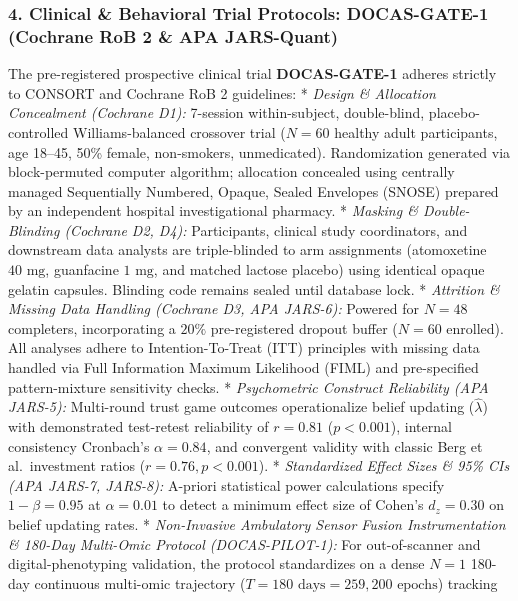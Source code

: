 \documentclass[
]{article}
\begin{document}
\subsubsection{4. Clinical \& Behavioral Trial Protocols: DOCAS-GATE-1
(Cochrane RoB 2 \& APA
JARS-Quant)}\label{clinical-behavioral-trial-protocols-docas-gate-1-cochrane-rob-2-apa-jars-quant}

The pre-registered prospective clinical trial \textbf{DOCAS-GATE-1}
adheres strictly to CONSORT and Cochrane RoB 2 guidelines: *
\emph{Design \& Allocation Concealment (Cochrane D1):} 7-session
within-subject, double-blind, placebo-controlled Williams-balanced
crossover trial (\(N = 60\) healthy adult participants, age 18--45, 50\%
female, non-smokers, unmedicated). Randomization generated via
block-permuted computer algorithm; allocation concealed using centrally
managed Sequentially Numbered, Opaque, Sealed Envelopes (SNOSE) prepared
by an independent hospital investigational pharmacy. * \emph{Masking \&
Double-Blinding (Cochrane D2, D4):} Participants, clinical study
coordinators, and downstream data analysts are triple-blinded to arm
assignments (atomoxetine \(40\text{ mg}\), guanfacine \(1\text{ mg}\),
and matched lactose placebo) using identical opaque gelatin capsules.
Blinding code remains sealed until database lock. * \emph{Attrition \&
Missing Data Handling (Cochrane D3, APA JARS-6):} Powered for \(N = 48\)
completers, incorporating a \(20\%\) pre-registered dropout buffer
(\(N = 60\) enrolled). All analyses adhere to Intention-To-Treat (ITT)
principles with missing data handled via Full Information Maximum
Likelihood (FIML) and pre-specified pattern-mixture sensitivity checks.
* \emph{Psychometric Construct Reliability (APA JARS-5):} Multi-round
trust game outcomes operationalize belief updating (\(\hat{\lambda}\))
with demonstrated test-retest reliability of \(r = 0.81\)
(\(p < 0.001\)), internal consistency Cronbach's \(\alpha = 0.84\), and
convergent validity with classic Berg et al.~investment ratios
(\(r = 0.76, p < 0.001\)). * \emph{Standardized Effect Sizes \& 95\% CIs
(APA JARS-7, JARS-8):} A-priori statistical power calculations specify
\(1 - \beta = 0.95\) at \(\alpha = 0.01\) to detect a minimum effect
size of Cohen's \(d_z = 0.30\) on belief updating rates. *
\emph{Non-Invasive Ambulatory Sensor Fusion Instrumentation \& 180-Day
Multi-Omic Protocol (DOCAS-PILOT-1):} For out-of-scanner and
digital-phenotyping validation, the protocol standardizes on a dense
\(N=1\) 180-day continuous multi-omic trajectory
(\(T=180\text{ days} = 259,200\text{ epochs}\)) tracking
\end{document}
